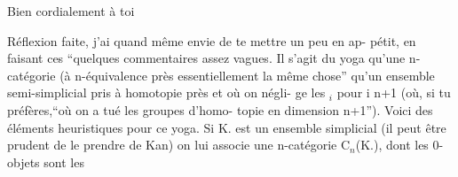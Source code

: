 Bien cordialement à toi


  Réflexion faite, j'ai quand même envie de te mettre un peu en ap-%
pétit, en faisant ces ``quelques commentaires assez vagues. Il s'agit du
yoga qu'une  n-catégorie  (à n-équivalence près   essentiellement la même
chose'' qu'un ensemble semi-simplicial pris à homotopie près et où on négli-%
ge les \hand{$\pi$}$_i$ pour i \hand{$\geq$} n+1 (où, si tu préfères,``où on a tué les groupes d'homo-%
topie en dimension \hand{$\geq$}n+1''). Voici des éléments heuristiques pour ce yoga.
Si K. est un ensemble simplicial (il peut être prudent de le prendre de
Kan) on lui associe une n-catégorie  C$_n$(K.), dont les 0-objets sont les


